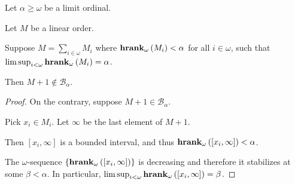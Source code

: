 \begin{lemma}
  Let $\alpha \ge \omega$ be a limit ordinal.

  Let $M$ be a linear order.
  
  Suppose $M = \sum_{i \in \omega} M_i$
  where $\mathbf{hrank}_{\omega}\left( M_i \right) < \alpha$ for all $i \in \omega$,
  such that $\limsup_{i < \omega}{\mathbf{hrank}_{\omega}\left( M_i \right)} = \alpha$.

  Then $M + 1 \notin \mathcal{B}_{\alpha}$.
\end{lemma}

\begin{proof}
  On the contrary, suppose $M + 1 \in \mathcal{B}_{\alpha}$.
  
  Pick $x_i \in M_i$. Let $\infty$ be the last element of $M + 1$.

  Then $[x_i, \infty]$ is a bounded interval, and thus
  $\mathbf{hrank}_{\omega}\left( [x_i, \infty] \right) < \alpha$.

  The $\omega$-sequence $\left\{ {\mathbf{hrank}_{\omega}\left( [x_i, \infty] \right)} \right\}$
  is decreasing and therefore it stabilizes at some $\beta < \alpha$.
  In particular, $\limsup_{i < \omega}{\mathbf{hrank}_{\omega}\left( [x_i, \infty] \right)} = \beta$.
\end{proof}
